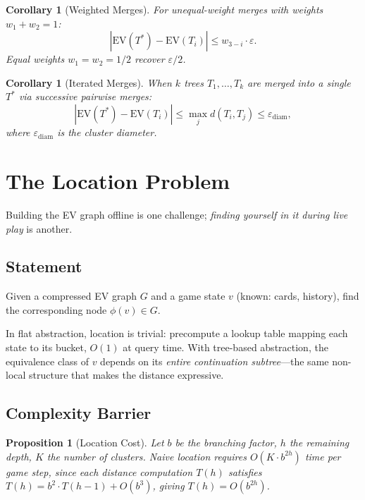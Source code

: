 \documentclass[11pt]{article}
\newtheorem{corollary}[theorem]{Corollary}
\newtheorem{proposition}[theorem]{Proposition}
\newcommand{\EV}{\mathrm{EV}}
\begin{document}
\begin{corollary}[Weighted Merges]
For unequal-weight merges with weights $w_1 + w_2 = 1$:
\[
  |\EV(T^*) - \EV(T_i)| \le w_{3-i} \cdot \varepsilon.
\]
Equal weights $w_1 = w_2 = 1/2$ recover $\varepsilon/2$.
\end{corollary}

\begin{corollary}[Iterated Merges]
When $k$ trees $T_1, \ldots, T_k$ are merged into a single $T^*$ via
successive pairwise merges:
\[
  |\EV(T^*) - \EV(T_i)| \le \max_j d(T_i, T_j) \le \varepsilon_{\mathrm{diam}},
\]
where $\varepsilon_{\mathrm{diam}}$ is the cluster diameter.
\end{corollary}

\section{The Location Problem}
\label{sec:location}

Building the EV graph offline is one challenge; \emph{finding yourself
in it during live play} is another.

\subsection{Statement}

Given a compressed EV graph $G$ and a game state $v$ (known: cards,
history), find the corresponding node $\phi(v) \in G$.

In flat abstraction, location is trivial: precompute a lookup table
mapping each state to its bucket, $O(1)$ at query time. With tree-based
abstraction, the equivalence class of $v$ depends on its \emph{entire
continuation subtree}---the same non-local structure that makes the
distance expressive.

\subsection{Complexity Barrier}

\begin{proposition}[Location Cost]
\label{prop:location}
Let $b$ be the branching factor, $h$ the remaining depth, $K$ the
number of clusters. Naive location requires $O(K \cdot b^{2h})$ time
per game step, since each distance computation $T(h)$ satisfies $T(h) =
b^2 \cdot T(h-1) + O(b^3)$, giving $T(h) = O(b^{2h})$.
\end{proposition}
\end{document}
